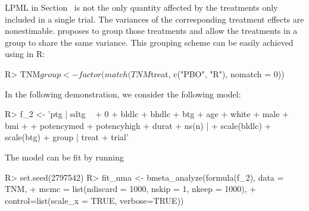 LPML in Section~ is not the only quantity affected by the treatments only included in a single trial. The variances of the corresponding treatment effects are nonestimable. \cite{li2019bayesian} proposes to group those treatments and allow the treatments in a group to share the same variance. This grouping scheme can be easily achieved using  in R:
\begin{example}
R> TNM$group <- factor(match(TNM$treat, c("PBO", "R"), nomatch = 0))
\end{example}

In the following demonstration, we consider the following model:
\begin{example}
R> f_2 <- 'ptg | sdtg ~
+     0 + bldlc + bhdlc + btg + age + white + male + bmi +
+     potencymed + potencyhigh + durat + ns(n) | 
+     scale(bldlc) + scale(btg) + group | treat  + trial'
\end{example}
The model can be fit by running
\begin{example}
R> set.seed(2797542)
R> fit_nma <- bmeta_analyze(formula(f_2), data = TNM,
+  mcmc = list(ndiscard = 1000, nskip = 1, nkeep = 1000),
+  control=list(scale_x = TRUE, verbose=TRUE))
\end{example}

